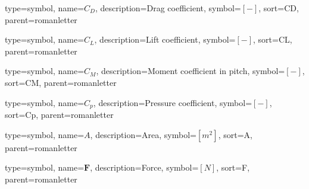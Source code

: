 {
type=symbol, %
name={\ensuremath{C_D}}, %
description={Drag coefficient}, %
symbol={$\left[-\right]$}, %
sort=CD, %
parent=romanletter %
}

{
type=symbol, %
name={\ensuremath{C_L}}, %
description={Lift coefficient}, %
symbol={$\left[-\right]$}, %
sort=CL, %
parent=romanletter %
}

{
type=symbol, %
name={\ensuremath{C_M}}, %
description={Moment coefficient in pitch}, %
symbol={$\left[-\right]$}, %
sort=CM, %
parent=romanletter %
}

{
	type=symbol, %
	name={\ensuremath{C_p}}, %
	description={Pressure coefficient}, %
	symbol={$\left[-\right]$}, %
	sort=Cp, %
	parent=romanletter %
}

{
type=symbol, %
name={\ensuremath{A}}, %
description={Area}, %
symbol={$\left[m^2\right]$}, %
sort=A, %
parent=romanletter %
}

{
type=symbol, %
name={\ensuremath{\mathbf{F}}}, %
description={Force}, %
symbol={$\left[N\right]$}, %
sort=F, %
parent=romanletter %
}

